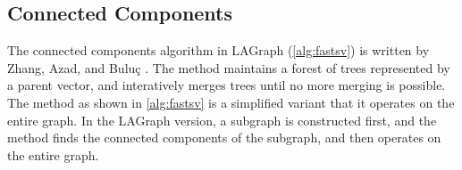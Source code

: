 \subsection{Connected Components}
\label{sec:connected-components}

The connected components algorithm in LAGraph (\autoref{alg:fastsv})
is written by Zhang, Azad, and Bulu{\c{c}}
\cite{ZHANG202014,DBLP:conf/ppsc/ZhangAH20}.  The method maintains a forest of
trees represented by a parent vector, and interatively merges trees until no
more merging is possible.  The method as shown in \autoref{alg:fastsv} is a
simplified variant that it operates on the entire graph.  In the LAGraph
version, a subgraph is constructed first, and the method finds the connected
components of the subgraph, and then operates on the entire graph.


